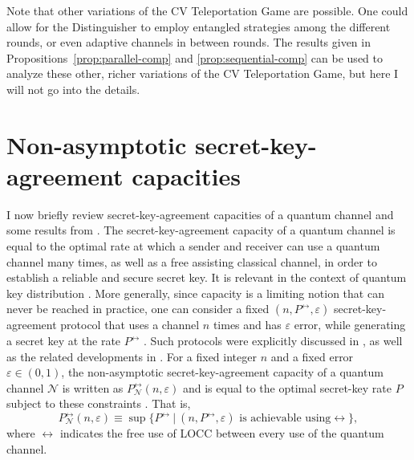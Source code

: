 \documentclass[apsrev,twocolumn]{revtex4-1}%
\begin{document}
Note that other variations of the CV Teleportation Game are possible. One
could allow for the Distinguisher to employ entangled strategies among the
different rounds, or even adaptive channels in between rounds. The results
given in Propositions~\ref{prop:parallel-comp} and \ref{prop:sequential-comp}
can be used to analyze these other, richer variations of the CV Teleportation
Game, but here I will not go into the details.

\section{Non-asymptotic secret-key-agreement capacities}

\label{sec:non-asymp-SKC}I now briefly review secret-key-agreement capacities
of a quantum channel and some results from \cite{WTB16}. The
secret-key-agreement capacity of a quantum channel is equal to the optimal
rate at which a sender and receiver can use a quantum channel many times, as
well as a free assisting classical channel, in order to establish a reliable
and secure secret key. It is relevant in the context of quantum key
distribution \cite{bb84,SBPC+09}. More generally, since capacity is a limiting
notion that can never be reached in practice, one can consider a fixed
$(n,P^{\leftrightarrow},\varepsilon)$ secret-key-agreement protocol that uses
a channel $n$ times and has $\varepsilon$ error, while generating a secret key
at the rate $P^{\leftrightarrow}$ \cite{WTB16}. Such protocols were explicitly
discussed in \cite{TGW14,TGW14Nat,WTB16}, as well as the related developments
in \cite{Goodenough2015,AML16,Christandl2017,BA17,KW17,KW17a,RKBKMA17,TSW17}.
For a fixed integer $n$ and a fixed error $\varepsilon\in(0,1)$, the
non-asymptotic secret-key-agreement capacity of a quantum channel
$\mathcal{N}$ is written as $P_{\mathcal{N}}^{\leftrightarrow}(n,\varepsilon)$
and is equal to the optimal secret-key rate $P$ subject to these constraints
\cite{WTB16}. That is,%
\begin{equation}
P_{\mathcal{N}}^{\leftrightarrow}(n,\varepsilon)\equiv\sup\{P^{\leftrightarrow
}\ |\ (n,P^{\leftrightarrow},\varepsilon)\text{ is achievable using
}\leftrightarrow\},
\end{equation}
where $\leftrightarrow$ indicates the free use of LOCC between every use of
the quantum channel.
\end{document}
